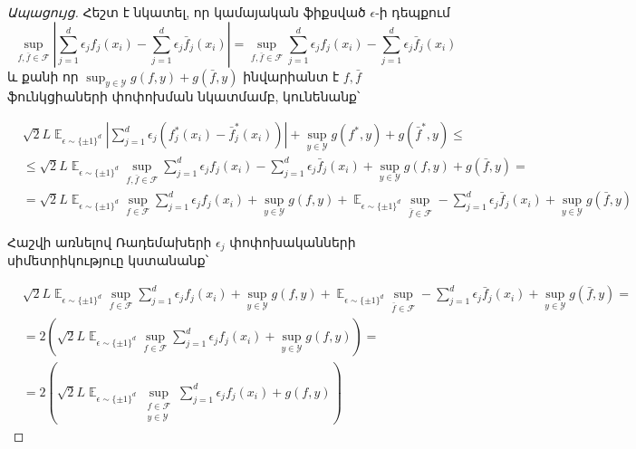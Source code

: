 \documentclass[12pt]{article}
\DeclareMathOperator*{\E}{\mathbb{E}}
\begin{document}
\begin{proof}[Ապացույց]
Հեշտ է նկատել, որ կամայական ֆիքսված $\epsilon$-ի դեպքում 
$$\sup_{f, \bar{f} \in \mathcal{F}}      \left |  \sum_{j=1}^d \epsilon_j f_j(x_i) - \sum_{j=1}^d \epsilon_j\bar{f}_j(x_i)  \right|  = 
\sup_{f, \bar{f} \in \mathcal{F}}         \sum_{j=1}^d \epsilon_j f_j(x_i) - \sum_{j=1}^d \epsilon_j\bar{f}_j(x_i)    $$
և քանի որ $\sup_{y \in \mathcal{Y}}    g(f, y) + g(\bar{f}, y)$ ինվարիանտ է $f, \bar{f}$ ֆունկցիաների փոփոխման նկատմամբ, կունենանք՝ 

\begin{align*}
&  {\sqrt{2}L} \E_{\epsilon \sim \{\pm 1\}^d}    \left |  \sum_{j=1}^d \epsilon_j (f^*_j(x_i) - \bar{f}_j^*(x_i))  \right|                    + \sup_{y \in \mathcal{Y}}    g(f^*, y) + g(\bar{f}^*, y)  \leq \\
&\leq  {\sqrt{2}L} \E_{\epsilon \sim \{\pm 1\}^d}        \sup_{f, \bar{f} \in \mathcal{F}}        \sum_{j=1}^d \epsilon_j f_j(x_i) - \sum_{j=1}^d \epsilon_j\bar{f}_j(x_i)                      + \sup_{y \in \mathcal{Y}}    g(f, y) + g(\bar{f}, y)  = \\
&=  {\sqrt{2}L} \E_{\epsilon \sim \{\pm 1\}^d}        \sup_{f \in \mathcal{F}}        \sum_{j=1}^d \epsilon_j f_j(x_i)    + \sup_{y \in \mathcal{Y}}    g(f, y)    +  \E_{\epsilon \sim \{\pm 1\}^d}        \sup_{\bar{f} \in \mathcal{F}}   -  \sum_{j=1}^d \epsilon_j\bar{f}_j(x_i)                      + \sup_{y \in \mathcal{Y}}  g(\bar{f}, y) 
\end{align*}


Հաշվի առնելով Ռադեմախերի $\epsilon_j$ փոփոխականների սիմետրիկություը կստանանք՝

\begin{align*}
&{\sqrt{2}L} \E_{\epsilon \sim \{\pm 1\}^d}        \sup_{f \in \mathcal{F}}        \sum_{j=1}^d \epsilon_j f_j(x_i)    + \sup_{y \in \mathcal{Y}}    g(f, y)    +  \E_{\epsilon \sim \{\pm 1\}^d}        \sup_{\bar{f} \in \mathcal{F}}   -  \sum_{j=1}^d \epsilon_j\bar{f}_j(x_i)                      + \sup_{y \in \mathcal{Y}}  g(\bar{f}, y)  = \\
&= 2\left({\sqrt{2}L} \E_{\epsilon \sim \{\pm 1\}^d}        \sup_{f \in \mathcal{F}}        \sum_{j=1}^d \epsilon_j f_j(x_i)    + \sup_{y \in \mathcal{Y}}    g(f, y)  \right)    = \\
&=  2\left({\sqrt{2}L} \E_{\epsilon \sim \{\pm 1\}^d}        \sup_{\substack{f \in \mathcal{F}  \\ y \in \mathcal{Y}  }}     \sum_{j=1}^d \epsilon_j f_j(x_i)    +   g(f, y)  \right)    
\end{align*}


\end{proof}
\end{document}
